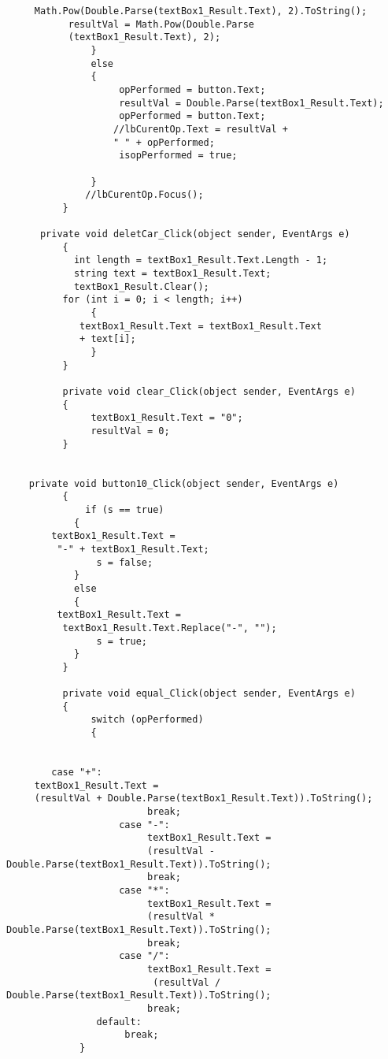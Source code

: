 \documentclass[11pt]{article}
\begin{document}
\begin{lstlisting}
     Math.Pow(Double.Parse(textBox1_Result.Text), 2).ToString();
           resultVal = Math.Pow(Double.Parse
           (textBox1_Result.Text), 2);
               }
               else
               {
                    opPerformed = button.Text;
                    resultVal = Double.Parse(textBox1_Result.Text);
                    opPerformed = button.Text;
                   //lbCurentOp.Text = resultVal + 
                   " " + opPerformed;
                    isopPerformed = true;

               }
              //lbCurentOp.Focus();
          }

      private void deletCar_Click(object sender, EventArgs e)
          {
            int length = textBox1_Result.Text.Length - 1;
            string text = textBox1_Result.Text;
            textBox1_Result.Clear();
          for (int i = 0; i < length; i++)
               {
             textBox1_Result.Text = textBox1_Result.Text 
             + text[i];
               }
          }

          private void clear_Click(object sender, EventArgs e)
          {
               textBox1_Result.Text = "0";
               resultVal = 0;
          }

        
    private void button10_Click(object sender, EventArgs e)
          {
              if (s == true)
            {
        textBox1_Result.Text =
         "-" + textBox1_Result.Text;
                s = false;
            }
            else
            {
         textBox1_Result.Text =
          textBox1_Result.Text.Replace("-", "");
                s = true;
            }
          }

          private void equal_Click(object sender, EventArgs e)
          {
               switch (opPerformed)
               {


        case "+":
     textBox1_Result.Text = 
     (resultVal + Double.Parse(textBox1_Result.Text)).ToString();
                         break;
                    case "-":
                         textBox1_Result.Text = 
                         (resultVal - Double.Parse(textBox1_Result.Text)).ToString();
                         break;
                    case "*":
                         textBox1_Result.Text = 
                         (resultVal * Double.Parse(textBox1_Result.Text)).ToString();
                         break;
                    case "/":
                         textBox1_Result.Text =
                          (resultVal / Double.Parse(textBox1_Result.Text)).ToString();
                         break;
                default:
                     break;
             }


\end{lstlisting}
\end{document}

